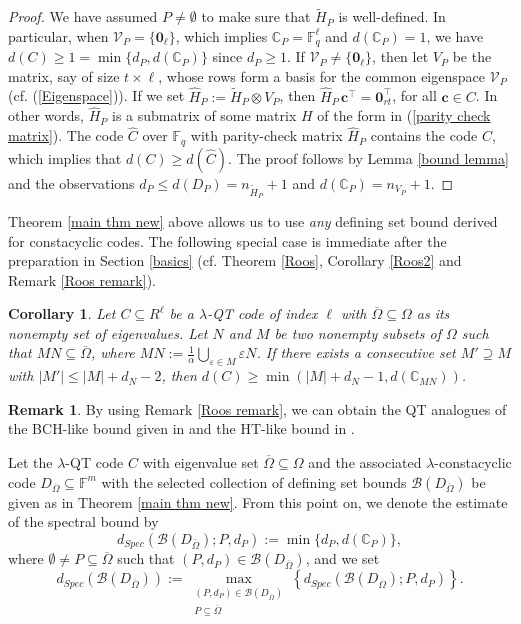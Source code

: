 \documentclass[11pt]{amsart}
\theoremstyle{plain}
\newtheorem{cor}[thm]{Corollary}
\theoremstyle{definition}
\newtheorem{rem}[thm]{Remark}
\numberwithin{equation}{section}
\newcommand{\Fq}{\mathbb{F}_{q}}
\newcommand{\F}{{\mathbb F}}
\begin{document}
\begin{proof}
We have assumed $P \neq \emptyset$ to make sure that $\widetilde{H}_P$ is well-defined. In particular, when $\mathcal{V}_P=\{\mathbf{0}_{\ell}\}$, which implies $\mathbb{C}_P= \Fq^\ell$ and $d(\mathbb{C}_P) =1$, we have $d(C) \ge 1 = \min\{d_P,d(\mathbb{C}_P)\}$ since $d_P\geq 1$. If $\mathcal{V}_P\neq\{\mathbf{0}_{\ell}\}$, then let $V_P$ be the matrix, say of size $t\times\ell$, whose rows form a basis for the common eigenspace $\mathcal{V}_P$ (cf. (\ref{Eigenspace})). If we set $\widehat{H}_P :=\widetilde{H}_P \otimes V_P$, then $\widehat{H}_P \, \mathbf{c}^{\top}=\mathbf{0}_{rt}^{\top}$, for all $\mathbf{c}\in C$. In other words, $\widehat{H}_P$ is a submatrix of some matrix $H$ of the form in (\ref{parity check matrix}). The code $\widehat{C}$ over $\F_q$ with parity-check matrix $\widehat{H}_P$ contains the code $C$, which implies that $d(C)\geq d(\widehat{C})$. The proof follows by Lemma \ref{bound lemma} and the observations $d_P\leq d(D_P)=n_{\widetilde{H}_P}+1$ and $d(\mathbb{C}_P) =n_{V_P}+1$.
\end{proof}

Theorem \ref{main thm new} above allows us to use \emph{any} defining set bound derived for constacyclic codes. The following special case is immediate after the preparation in Section \ref{basics} (cf. Theorem \ref{Roos}, Corollary \ref{Roos2} and Remark \ref{Roos remark}). 

\begin{cor}\label{Cor-Roos new}
Let $C\subseteq R^\ell$ be a $\lambda$-QT code of index $\ell$ with $\overline{\Omega}\subseteq\Omega$ as its nonempty set of eigenvalues. Let $N$ and $M$ be two nonempty subsets of $\Omega$ such that $MN\subseteq\overline{\Omega}$, where $MN:=\frac{1}{\alpha}\bigcup_{\varepsilon\in M} \varepsilon N$. If there exists a consecutive set $M'\supseteq M$ with $|M'|\leq |M|+d_N-2$, then $d(C)\geq \min(|M|+d_N-1,d(\mathbb{C}_{MN}))$.
\end{cor}

\begin{rem}\label{ext remark}
By using Remark \ref{Roos remark}, we can obtain the QT analogues of the BCH-like bound given in \cite[Theorem 2]{ST} and the HT-like bound in \cite[Theorem 1]{LZ}. 
\end{rem}

Let the $\lambda$-QT code $C$ with eigenvalue set $\overline{\Omega}\subseteq\Omega$ and the associated $\lambda$-constacyclic code $D_{\overline{\Omega}}\subseteq \F^m$ with the selected collection of defining set bounds $\mathcal{B}(D_{\overline{\Omega}})$ be given as in Theorem \ref{main thm new}. From this point on, we denote the estimate of the spectral bound by $$d_{Spec}(\mathcal{B}(D_{\overline{\Omega}}) ; P,d_P):=\min\{d_P, d(\mathbb{C}_P)\},$$ where $\emptyset\neq P \subseteq \overline{\Omega}$ such that $(P,d_P)\in\mathcal{B}(D_{\overline{\Omega}})$, and we set 
\[
d_{Spec}(\mathcal{B}(D_{\overline{\Omega}})):=\displaystyle\max_{\substack{(P, d_P)\in \mathcal{B}(D_{\overline{\Omega}}) \\  P \subseteq \overline{\Omega}}}\left\{d_{Spec}(\mathcal{B}(D_{\overline{\Omega}}) ; P,d_P)\right\}.
\]
\end{document}
